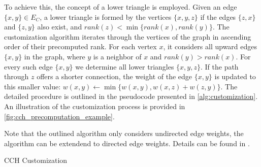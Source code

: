 To achieve this, the concept of a lower triangle is employed.
Given an edge \(\{x, y\} \in E_C\), a lower triangle is formed by the vertices \(\{x, y, z\}\) if the edges \(\{z, x\}\) and \(\{z, y\}\) also exist, and \(rank(z) < \min\{rank(x), rank(y)\}\).
The customization algorithm iterates through the vertices of the graph in ascending order of their precomputed rank.
For each vertex \(x\), it considers all upward edges \(\{x, y\}\) in the graph, where \(y\) is a neighbor of \(x\) and \(rank(y) > rank(x)\).
For every such edge \(\{x, y\}\) we determine all lower triangles \(\{x, y, z\}\).
If the path through \(z\) offers a shorter connection, the weight of the edge \(\{x, y\}\) is updated to this smaller value: \(w(x, y) \leftarrow \min\{w(x, y), w(x, z) + w(z, y)\}\).
The detailed procedure is outlined in the pseudocode presented in \cref{alg:customization}.
An illustration of the customization process is provided in \cref{fig:cch_precomputation_example}.

Note that the outlined algorithm only considers undirected edge weights, the algorithm can be extendend to directed edge weights. Details can be found in \cite{dibbelt_customizable_2016}.

\begin{algorithm}
	\BlankLine
	\caption{CCH Customization}
	\label{alg:customization}
\end{algorithm}

